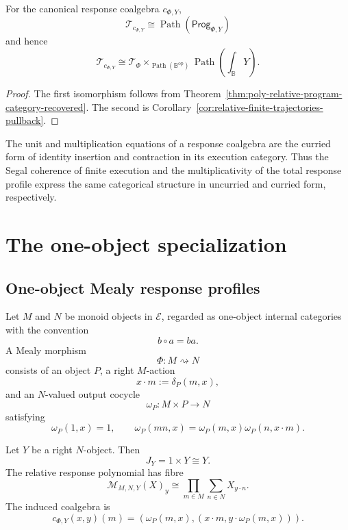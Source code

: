 \begin{corollary}
\label{cor:relative-mealy-response-trajectories}
For the canonical response coalgebra \(c_{\Phi,Y}\),
\[
    \mathscr T_{c_{\Phi,Y}}
    \cong
    \operatorname{Path}(\mathsf{Prog}_{\Phi,Y})
\]
and hence
\[
    \mathscr T_{c_{\Phi,Y}}
    \cong
    \mathscr T_\Phi
    \times_{\operatorname{Path}(\mathbb B^{\mathrm{op}})}
    \operatorname{Path}\!\left(\int_{\mathbb B}Y\right).
\]
\end{corollary}

\begin{proof}
The first isomorphism follows from
Theorem~\ref{thm:poly-relative-program-category-recovered}.  The second is
Corollary~\ref{cor:relative-finite-trajectories-pullback}.
\end{proof}

\begin{remark}
\label{rem:relative-multiplicativity-segal}
The unit and multiplication equations of a response coalgebra are the
curried form of identity insertion and contraction in its execution category.
Thus the Segal coherence of finite execution and the multiplicativity of the
total response profile express the same categorical structure in uncurried
and curried form, respectively.
\end{remark}

\section{The one-object specialization}
\label{sec:poly-relative-one-object-specialization}

\subsection{One-object Mealy response profiles}
\label{subsec:poly-relative-one-object-response-profiles}

Let \(M\) and \(N\) be monoid objects in \(\mathcal E\), regarded as
one-object internal categories with the convention
\[
b\circ a=ba.
\]
A Mealy morphism
\[
\Phi:M\rightsquigarrow N
\]
consists of an object \(P\), a right \(M\)-action
\[
x\cdot m:=\delta_P(m,x),
\]
and an \(N\)-valued output cocycle
\[
\omega_P:M\times P\to N
\]
satisfying
\[
\omega_P(1,x)=1,
\qquad
\omega_P(mn,x)=\omega_P(m,x)\omega_P(n,x\cdot m).
\]

Let \(Y\) be a right \(N\)-object.  Then
\[
J_Y=1\times Y\cong Y.
\]
The relative response polynomial has fibre
\[
\mathcal M_{M,N,Y}(X)_y
\cong
\prod_{m\in M}
\sum_{n\in N}
X_{y\cdot n}.
\]
The induced coalgebra is
\[
c_{\Phi,Y}(x,y)(m)
=
\left(
\omega_P(m,x),
\left(
x\cdot m,
y\cdot\omega_P(m,x)
\right)
\right).
\]

